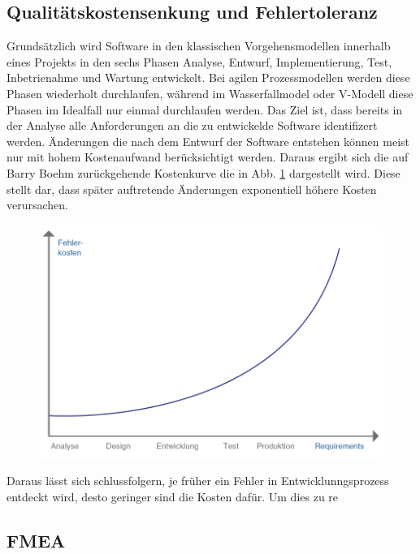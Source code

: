 \subsection{Qualitätskostensenkung und Fehlertoleranz}
Grundsätzlich wird Software in den klassischen Vorgehensmodellen innerhalb eines Projekts in den sechs Phasen Analyse, Entwurf, Implementierung, Test, Inbetrienahme und Wartung entwickelt.
Bei agilen Prozessmodellen werden diese Phasen wiederholt durchlaufen, während im Wasserfallmodel oder V-Modell diese Phasen im Idealfall nur einmal durchlaufen werden.
Das Ziel ist, dass bereits in der Analyse alle Anforderungen an die zu entwickelde Software identifizert werden.
Änderungen die nach dem Entwurf der Software entstehen können meist nur mit hohem Kostenaufwand berücksichtigt werden.
Daraus ergibt sich die auf Barry Boehm zurückgehende Kostenkurve die in Abb. \ref{fig:boehm} dargestellt wird.
Diese stellt dar, dass später auftretende Änderungen exponentiell höhere Kosten verursachen.
\autocite[vgl.][S. 95]{witte_testmanagement_2019}
\begin{figure}[H]
    \centering
    \includegraphics[width=1\textwidth]{images/boehm.png}
    \label{fig:boehm}
\end{figure}\noindent
Daraus lässt sich schlussfolgern, je früher ein Fehler in Entwicklunngsprozess entdeckt wird, desto geringer sind die Kosten dafür.
Um dies zu re





\subsection{\acl{FMEA}}





